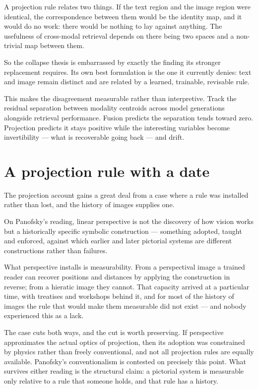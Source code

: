 \documentclass[11pt,a4paper]{article}
\begin{document}
A projection rule relates two things. If the text region and the image region were identical, the correspondence between them would be the identity map, and it would do no work: there would be nothing to lay against anything. The usefulness of cross-modal retrieval depends on there being two spaces and a non-trivial map between them.

So the collapse thesis is embarrassed by exactly the finding its stronger replacement requires. Its own best formulation is the one it currently denies: text and image remain distinct and are related by a learned, trainable, revisable rule.

This makes the disagreement measurable rather than interpretive. Track the residual separation between modality centroids across model generations alongside retrieval performance. Fusion predicts the separation tends toward zero. Projection predicts it stays positive while the interesting variables become invertibility --- what is recoverable going back --- and drift.

\section{A projection rule with a date}
The projection account gains a great deal from a case where a rule was installed rather than lost, and the history of images supplies one.

On Panofsky's reading, linear perspective is not the discovery of how vision works but a historically specific symbolic construction --- something adopted, taught and enforced, against which earlier and later pictorial systems are different constructions rather than failures.

What perspective installs is measurability. From a perspectival image a trained reader can recover positions and distances by applying the construction in reverse; from a hieratic image they cannot. That capacity arrived at a particular time, with treatises and workshops behind it, and for most of the history of images the rule that would make them measurable did not exist --- and nobody experienced this as a lack.

The case cuts both ways, and the cut is worth preserving. If perspective approximates the actual optics of projection, then its adoption was constrained by physics rather than freely conventional, and not all projection rules are equally available. Panofsky's conventionalism is contested on precisely this point. What survives either reading is the structural claim: a pictorial system is measurable only relative to a rule that someone holds, and that rule has a history.
\end{document}
